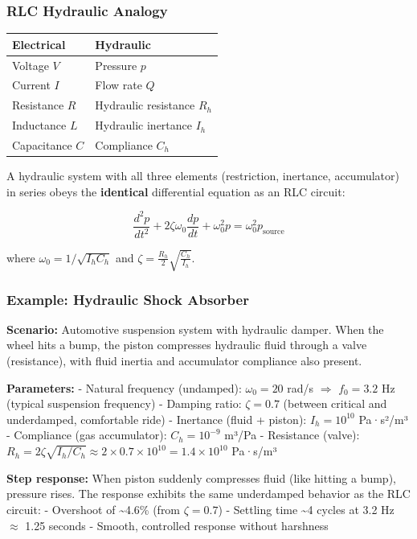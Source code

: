 \documentclass[
]{article}
\begin{document}
\subsubsection{RLC Hydraulic Analogy}\label{rlc-hydraulic-analogy}

\begin{longtable}[]{@{}ll@{}}
\toprule\noalign{}
Electrical & Hydraulic \\
\midrule\noalign{}
\endhead
\bottomrule\noalign{}
\endlastfoot
Voltage \(V\) & Pressure \(p\) \\
Current \(I\) & Flow rate \(Q\) \\
Resistance \(R\) & Hydraulic resistance \(R_h\) \\
Inductance \(L\) & Hydraulic inertance \(I_h\) \\
Capacitance \(C\) & Compliance \(C_h\) \\
\end{longtable}

A hydraulic system with all three elements (restriction, inertance,
accumulator) in series obeys the \textbf{identical} differential
equation as an RLC circuit:

\[\frac{d^2p}{dt^2} + 2\zeta\omega_0\frac{dp}{dt} + \omega_0^2 p = \omega_0^2 p_{\text{source}}\]

where \(\omega_0 = 1/\sqrt{I_h C_h}\) and
\(\zeta = \frac{R_h}{2}\sqrt{\frac{C_h}{I_h}}\).

\subsubsection{Example: Hydraulic Shock
Absorber}\label{example-hydraulic-shock-absorber}

\textbf{Scenario:} Automotive suspension system with hydraulic damper.
When the wheel hits a bump, the piston compresses hydraulic fluid
through a valve (resistance), with fluid inertia and accumulator
compliance also present.

\textbf{Parameters:} - Natural frequency (undamped): \(\omega_0 = 20\)
rad/s \(\Rightarrow\) \(f_0 = 3.2\) Hz (typical suspension frequency) -
Damping ratio: \(\zeta = 0.7\) (between critical and underdamped,
comfortable ride) - Inertance (fluid + piston): \(I_h = 10^{10}\)
Pa·s²/m³ - Compliance (gas accumulator): \(C_h = 10^{-9}\) m³/Pa -
Resistance (valve):
\(R_h = 2\zeta\sqrt{I_h/C_h} \approx 2 \times 0.7 \times 10^{10} = 1.4 \times 10^{10}\)
Pa·s/m³

\textbf{Step response:} When piston suddenly compresses fluid (like
hitting a bump), pressure rises. The response exhibits the same
underdamped behavior as the RLC circuit: - Overshoot of
\textasciitilde4.6\% (from \(\zeta = 0.7\)) - Settling time
\textasciitilde4 cycles at 3.2 Hz \(\approx\) 1.25 seconds - Smooth,
controlled response without harshness
\end{document}
